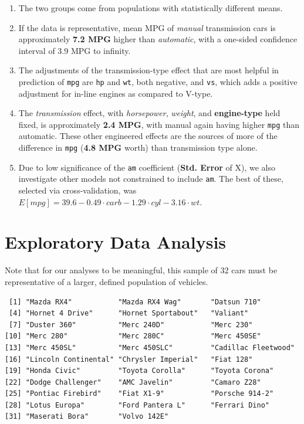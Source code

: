 \documentclass[]{article}
\providecommand{\tightlist}{%
  \setlength{\itemsep}{0pt}\setlength{\parskip}{0pt}}
\begin{document}
\begin{enumerate}
\def\labelenumi{\arabic{enumi}.}
\tightlist
\item
  The two groups come from populations with statistically different
  means.
\item
  If the data is representative, mean MPG of \emph{manual} transmission
  cars is approximately \textbf{7.2 MPG} higher than \emph{automatic},
  with a one-sided confidence interval of 3.9 MPG to infinity.
\item
  The adjustments of the transmission-type effect that are most helpful
  in prediction of \texttt{mpg} are \texttt{hp} and \texttt{wt}, both
  negative, and \texttt{vs}, which adds a positive adjustment for
  in-line engines as compared to V-type.
\item
  The \emph{transmission} effect, with \emph{horsepower}, \emph{weight},
  and \textbf{engine-type} held fixed, is approximately \textbf{2.4
  MPG}, with manual again having higher \texttt{mpg} than automatic.
  These other engineered effects are the sources of more of the
  difference in \texttt{mpg} (\textbf{4.8 MPG} worth) than transmission
  type alone.
\item
  Due to low significance of the \texttt{am} coefficient (\textbf{Std.
  Error} of X), we also investigate other models not constrained to
  include \texttt{am}. The best of these, selected via cross-validation,
  was \(E[mpg] = 39.6 -0.49\cdot carb -1.29\cdot cyl -3.16\cdot wt\).
\end{enumerate}

\section{Exploratory Data Analysis}\label{exploratory-data-analysis}

Note that for our analyses to be meaningful, this sample of 32 cars must
be representative of a larger, defined population of vehicles.

\begin{verbatim}
 [1] "Mazda RX4"           "Mazda RX4 Wag"       "Datsun 710"         
 [4] "Hornet 4 Drive"      "Hornet Sportabout"   "Valiant"            
 [7] "Duster 360"          "Merc 240D"           "Merc 230"           
[10] "Merc 280"            "Merc 280C"           "Merc 450SE"         
[13] "Merc 450SL"          "Merc 450SLC"         "Cadillac Fleetwood" 
[16] "Lincoln Continental" "Chrysler Imperial"   "Fiat 128"           
[19] "Honda Civic"         "Toyota Corolla"      "Toyota Corona"      
[22] "Dodge Challenger"    "AMC Javelin"         "Camaro Z28"         
[25] "Pontiac Firebird"    "Fiat X1-9"           "Porsche 914-2"      
[28] "Lotus Europa"        "Ford Pantera L"      "Ferrari Dino"       
[31] "Maserati Bora"       "Volvo 142E"         
\end{verbatim}
\end{document}
